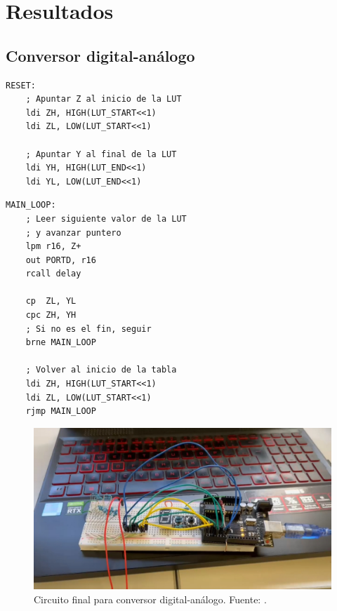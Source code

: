\newpage

\section{Resultados}
\subsection{Conversor digital-análogo}

\begin{verbatim}
RESET:
    ; Apuntar Z al inicio de la LUT
    ldi ZH, HIGH(LUT_START<<1)
    ldi ZL, LOW(LUT_START<<1)

    ; Apuntar Y al final de la LUT
    ldi YH, HIGH(LUT_END<<1)
    ldi YL, LOW(LUT_END<<1)
\end{verbatim}

\begin{verbatim}
MAIN_LOOP:
    ; Leer siguiente valor de la LUT
    ; y avanzar puntero
    lpm r16, Z+
    out PORTD, r16
    rcall delay

    cp  ZL, YL
    cpc ZH, YH
    ; Si no es el fin, seguir
    brne MAIN_LOOP

    ; Volver al inicio de la tabla
    ldi ZH, HIGH(LUT_START<<1)
    ldi ZL, LOW(LUT_START<<1)
    rjmp MAIN_LOOP
\end{verbatim}

\begin{figure}[H]
  \centering
  \includegraphics[width=\linewidth]{./Anexos/Resultados/DAC/Circuito.jpg}
  \caption{Circuito final para conversor digital-análogo. Fuente: \cite{LabDrive}.}
  \label{fig:conversor_circuito}
\end{figure}

